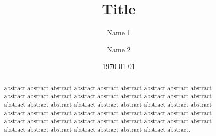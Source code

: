 \documentclass[dvipdfmx,twocolumn,preprintnumbers,superscriptaddress,nofootinbib]{revtex4-2}
\begin{document}
\title{Title}

\author{Name 1}

\author{Name 2}

\date{\today}

\begin{abstract}
    abstract abstract abstract abstract abstract abstract abstract abstract abstract abstract abstract abstract abstract abstract abstract abstract abstract abstract abstract abstract abstract abstract abstract abstract abstract abstract abstract abstract abstract abstract abstract abstract abstract abstract abstract abstract abstract abstract abstract abstract abstract abstract abstract abstract abstract abstract abstract abstract abstract abstract abstract abstract abstract.
\end{abstract}


\maketitle




\newpage


\newpage

\end{document}
